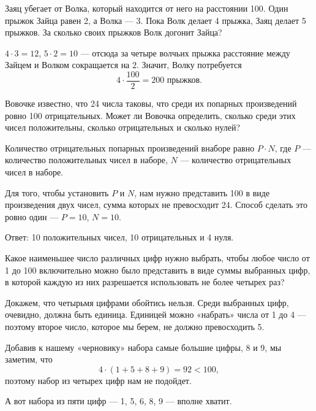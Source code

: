 ﻿


\begin{itemize}

	\def\metr#1{\SI{#1}{\text{м}}}
	\itA Заяц убегает от Волка, который находится от него на расстоянии \metr{100}. Один прыжок Зайца равен \metr{2}, а Волка — \metr{3}. Пока Волк делает 4 прыжка, Заяц делает 5 прыжков. За сколько своих прыжков Волк догонит Зайца?
	
	\itr $4 \cdot 3 = 12$, $5 \cdot 2 = 10$ — отсюда за четыре волчьих прыжка расстояние между Зайцем и Волком сокращается на \metr{2}. Значит, Волку потребуется
	$$4 \cdot \frac{100}{2} = 200\text{ прыжков.}$$
	
	\itB Вовочке известно, что 24 числа таковы, что среди их попарных произведений ровно 100 отрицательных. Может ли Вовочка определить, сколько среди этих чисел положительны, сколько отрицательных и сколько нулей?
	
	\itr Количество отрицательных попарных произведений в\linebreak наборе равно $P \cdot N$, где $P$ — количество положительных чисел в наборе, $N$ — количество отрицательных чисел в наборе.
	
	Для того, чтобы установить $P$ и $N$, нам нужно представить 100 в виде произведения двух чисел, сумма которых не превосходит 24. Способ сделать это ровно один — $P=10$, $N=10$.
	
	Ответ: 10 положительных чисел, 10 отрицательных и 4 нуля.
	
	\itC Какое наименьшее число различных цифр нужно выбрать, чтобы любое число от 1 до 100 включительно можно было представить в виде суммы выбранных цифр, в которой каждую из них разрешается использовать не более четырех раз?
	
	\itr Докажем, что четырьмя цифрами обойтись нельзя. Среди выбранных цифр, очевидно, должна быть единица. Единицей можно «набрать» числа от 1 до 4 — поэтому второе число, которое мы берем, не должно превосходить 5.
	
	Добавив к нашему «черновику» набора самые большие цифры, 8 и 9, мы заметим, что
	$$4 \cdot (1+5+8+9) = 92 < 100,$$
	поэтому набор из четырех цифр нам не подойдет.
	
	А вот набора из пяти цифр — 1, 5, 6, 8, 9 — вполне хватит.

\end{itemize}


